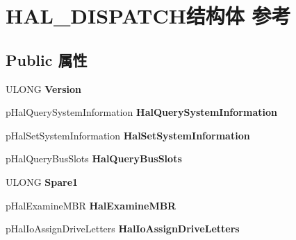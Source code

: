 \hypertarget{struct_h_a_l___d_i_s_p_a_t_c_h}{}\section{H\+A\+L\+\_\+\+D\+I\+S\+P\+A\+T\+C\+H结构体 参考}
\label{struct_h_a_l___d_i_s_p_a_t_c_h}
\subsection*{Public 属性}
\begin{DoxyCompactItemize}
\item 
\mbox{\label{struct_h_a_l___d_i_s_p_a_t_c_h_ace63ec0ef7ea86179ed2f2a216d35bab}} 
U\+L\+O\+NG {\bfseries Version}
\item 
\mbox{\label{struct_h_a_l___d_i_s_p_a_t_c_h_afd21a6d1f88fdbf0190b3785d09ebcc0}} 
p\+Hal\+Query\+System\+Information {\bfseries Hal\+Query\+System\+Information}
\item 
\mbox{\label{struct_h_a_l___d_i_s_p_a_t_c_h_ad15ccef0d75a9303b18039527ee8ea43}} 
p\+Hal\+Set\+System\+Information {\bfseries Hal\+Set\+System\+Information}
\item 
\mbox{\label{struct_h_a_l___d_i_s_p_a_t_c_h_a1155ad6f385a564e22cdfc39f43b8ae9}} 
p\+Hal\+Query\+Bus\+Slots {\bfseries Hal\+Query\+Bus\+Slots}
\item 
\mbox{\label{struct_h_a_l___d_i_s_p_a_t_c_h_a09fdcdfb76c5abdf01e44b0530966c0f}} 
U\+L\+O\+NG {\bfseries Spare1}
\item 
\mbox{\label{struct_h_a_l___d_i_s_p_a_t_c_h_ab33e816ba3485ab3c8ac281a73c3677c}} 
p\+Hal\+Examine\+M\+BR {\bfseries Hal\+Examine\+M\+BR}
\item 
\mbox{\label{struct_h_a_l___d_i_s_p_a_t_c_h_a22a0838b35e273f7954b9b603a3df405}} 
p\+Hal\+Io\+Assign\+Drive\+Letters {\bfseries Hal\+Io\+Assign\+Drive\+Letters}
\item 
\mbox{\label{struct_h_a_l___d_i_s_p_a_t_c_h_a966fc94aefb2bd29cf10f69e39cb73ec}} 

\end{DoxyCompactItemize}
